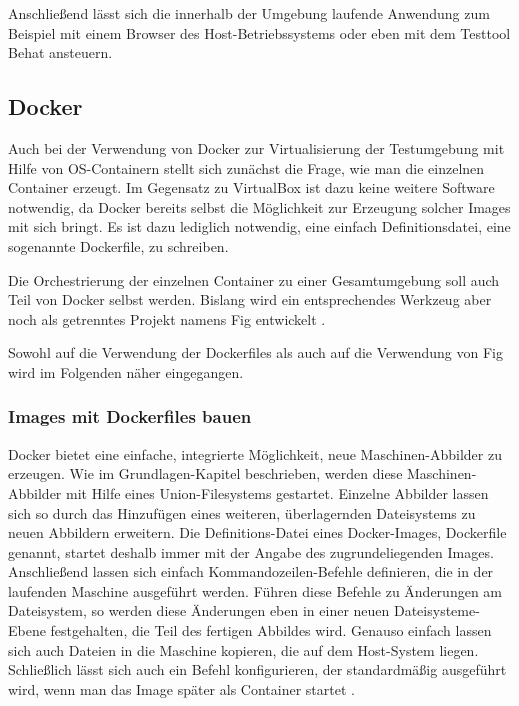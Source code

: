 Anschließend lässt sich die innerhalb der Umgebung laufende Anwendung zum Beispiel mit einem Browser des Host-Betriebssystems oder eben mit dem Testtool Behat ansteuern.

\subsection{Docker}

Auch bei der Verwendung von Docker zur Virtualisierung der Testumgebung mit Hilfe von OS-Containern stellt sich zunächst die Frage, wie man die einzelnen Container erzeugt. Im Gegensatz zu VirtualBox ist dazu keine weitere Software notwendig, da Docker bereits selbst die Möglichkeit zur Erzeugung solcher Images mit sich bringt. Es ist dazu lediglich notwendig, eine einfach Definitionsdatei, eine sogenannte Dockerfile, zu schreiben.

Die Orchestrierung der einzelnen Container zu einer Gesamtumgebung soll auch Teil von Docker selbst werden. Bislang wird ein entsprechendes Werkzeug aber noch als getrenntes Projekt namens Fig entwickelt \citep[Vgl.][]{docker:005}.

Sowohl auf die Verwendung der Dockerfiles als auch auf die Verwendung von Fig wird im Folgenden näher eingegangen.

\subsubsection{Images mit Dockerfiles bauen}

Docker bietet eine einfache, integrierte Möglichkeit, neue Maschinen-Abbilder zu erzeugen. Wie im Grundlagen-Kapitel beschrieben, werden diese Maschinen-Abbilder mit Hilfe eines Union-Filesystems gestartet. Einzelne Abbilder lassen sich so durch das Hinzufügen eines weiteren, überlagernden Dateisystems zu neuen Abbildern erweitern. Die Definitions-Datei eines Docker-Images, Dockerfile genannt, startet deshalb immer mit der Angabe des zugrundeliegenden Images. Anschließend lassen sich einfach Kommandozeilen-Befehle definieren, die in der laufenden Maschine ausgeführt werden. Führen diese Befehle zu Änderungen am Dateisystem, so werden diese Änderungen eben in einer neuen Dateisysteme-Ebene festgehalten, die Teil des fertigen Abbildes wird. Genauso einfach lassen sich auch Dateien in die Maschine kopieren, die auf dem Host-System liegen. Schließlich lässt sich auch ein Befehl konfigurieren, der standardmäßig ausgeführt wird, wenn man das Image später als Container startet \citep[Vgl.][]{docker:003}.

